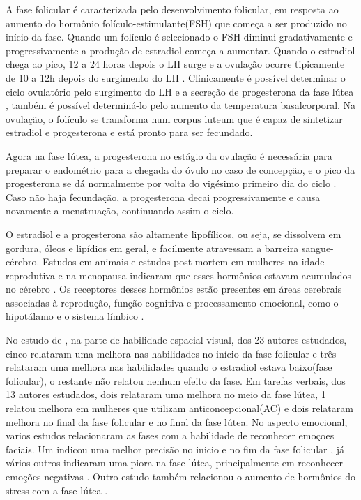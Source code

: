 A fase folicular é caracterizada pelo desenvolvimento folicular, em resposta ao aumento do hormônio folículo-estimulante(FSH) que começa a ser produzido no início da fase. Quando um folículo é selecionado o FSH diminui gradativamente e progressivamente a produção de estradiol começa a aumentar. Quando o estradiol chega ao pico, 12 a 24 horas depois o LH surge e a ovulação ocorre tipicamente de 10 a 12h depois do surgimento do LH \cite{fritz2010}. Clinicamente é possível determinar o ciclo ovulatório pelo surgimento do LH e a secreção de progesterona da fase lútea \cite{fritz2010}, também é possível determiná-lo pelo aumento da temperatura basalcorporal. Na ovulação, o folículo se transforma num corpus luteum que é capaz de sintetizar estradiol e progesterona e está pronto para ser fecundado.

Agora na fase lútea, a progesterona no estágio da ovulação é necessária para preparar o endométrio para a chegada do óvulo no caso de concepção, e o pico da progesterona se dá normalmente por volta do vigésimo primeiro dia do ciclo \cite{nikas2003}. Caso não haja fecundação, a progesterona decai progressivamente e causa novamente a menstruação, continuando assim o ciclo.

O estradiol e a progesterona são altamente lipofílicos, ou seja, se dissolvem em gordura, óleos e lipídios em geral, e facilmente atravessam a barreira sangue-cérebro. Estudos em animais e estudos post-mortem em mulheres na idade reprodutiva e na menopausa indicaram que esses hormônios estavam acumulados no cérebro \cite{bixo1997}. Os receptores desses hormônios estão presentes em áreas cerebrais associadas à reprodução, função cognitiva e processamento emocional, como o hipotálamo e o sistema límbico \cite{gruber2002, brinton2008}.

 No estudo de , na parte de habilidade espacial visual, dos 23 autores estudados, cinco relataram uma melhora nas habilidades no início da fase folicular e três relataram uma melhora nas habilidades quando o estradiol estava baixo(fase folicular), o restante não relatou nenhum efeito da fase. Em tarefas verbais, dos 13 autores estudados, dois relataram uma melhora no meio da fase lútea, 1 relatou melhora em mulheres que utilizam anticoncepcional(AC) e dois relataram melhora no final da fase folicular e no final da fase lútea. No aspecto emocional, varios estudos relacionaram as fases com a habilidade de reconhecer emoçoes faciais. Um indicou uma melhor precisão no inicio e no fim da fase folicular \cite{dernl2013}, já vários outros indicaram uma piora na fase lútea, principalmente em reconhecer emoções negativas \cite{gasbarri2008}. Outro estudo também relacionou o aumento de hormônios do stress com a fase lútea \cite{kirschbaum1999}.

